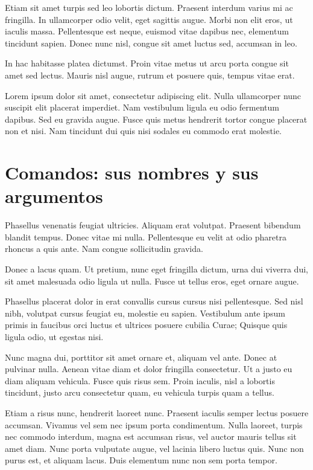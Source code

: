 \documentclass[12pt,a4paper]{report}
\begin{document}
Etiam sit amet turpis sed leo lobortis dictum. Praesent interdum varius mi ac fringilla. In ullamcorper odio velit, eget sagittis augue. Morbi non elit eros, ut iaculis massa. Pellentesque est neque, euismod vitae dapibus nec, elementum tincidunt sapien. Donec nunc nisl, congue sit amet luctus sed, accumsan in leo. 

In hac habitasse platea dictumst. Proin vitae metus ut arcu porta congue sit amet sed lectus. Mauris nisl augue, rutrum et posuere quis, tempus vitae erat.

Lorem ipsum dolor sit amet, consectetur adipiscing elit. Nulla ullamcorper nunc suscipit elit placerat imperdiet. Nam vestibulum ligula eu odio fermentum dapibus. Sed eu gravida augue. Fusce quis metus hendrerit tortor congue placerat non et nisi. Nam tincidunt dui quis nisi sodales eu commodo erat molestie. 




\section{Comandos: sus nombres y sus argumentos}
\label{seccion.comandos}



Phasellus venenatis feugiat ultricies. Aliquam erat volutpat. Praesent bibendum blandit tempus. Donec vitae mi nulla. Pellentesque eu velit at odio pharetra rhoncus a quis ante. Nam congue sollicitudin gravida. 

Donec a lacus quam. Ut pretium, nunc eget fringilla dictum, urna dui viverra dui, sit amet malesuada odio ligula ut nulla. Fusce ut tellus eros, eget ornare augue.

Phasellus placerat dolor in erat convallis cursus cursus nisi pellentesque. Sed nisl nibh, volutpat cursus feugiat eu, molestie eu sapien. Vestibulum ante ipsum primis in faucibus orci luctus et ultrices posuere cubilia Curae; Quisque quis ligula odio, ut egestas nisi. 

Nunc magna dui, porttitor sit amet ornare et, aliquam vel ante. Donec at pulvinar nulla. Aenean vitae diam et dolor fringilla consectetur. Ut a justo eu diam aliquam vehicula. Fusce quis risus sem. Proin iaculis, nisl a lobortis tincidunt, justo arcu consectetur quam, eu vehicula turpis quam a tellus.

Etiam a risus nunc, hendrerit laoreet nunc. Praesent iaculis semper lectus posuere accumsan. Vivamus vel sem nec ipsum porta condimentum. Nulla laoreet, turpis nec commodo interdum, magna est accumsan risus, vel auctor mauris tellus sit amet diam. Nunc porta vulputate augue, vel lacinia libero luctus quis. Nunc non purus est, et aliquam lacus. Duis elementum nunc non sem porta tempor.
\end{document}
